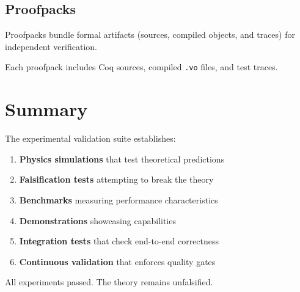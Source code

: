 \subsection{Proofpacks}

Proofpacks bundle formal artifacts (sources, compiled objects, and traces) for independent verification.

Each proofpack includes Coq sources, compiled \texttt{.vo} files, and test traces.

\section{Summary}


The experimental validation suite establishes:
\begin{enumerate}
    \item \textbf{Physics simulations} that test theoretical predictions
    \item \textbf{Falsification tests} attempting to break the theory
    \item \textbf{Benchmarks} measuring performance characteristics
    \item \textbf{Demonstrations} showcasing capabilities
    \item \textbf{Integration tests} that check end-to-end correctness
    \item \textbf{Continuous validation} that enforces quality gates
\end{enumerate}

All experiments passed. The theory remains unfalsified.

